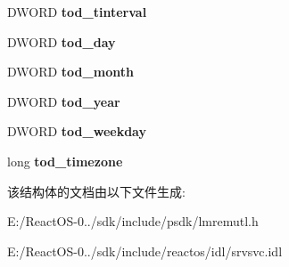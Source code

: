 \begin{DoxyCompactItemize}
\mbox{\label{struct___t_i_m_e___o_f___d_a_y___i_n_f_o_a1ca8798b067474d6fb2293686afc9b65}} 
D\+W\+O\+RD {\bfseries tod\+\_\+tinterval}
\item 
\mbox{\label{struct___t_i_m_e___o_f___d_a_y___i_n_f_o_a52cf511aa5bdc76354fb1401d225ad2d}} 
D\+W\+O\+RD {\bfseries tod\+\_\+day}
\item 
\mbox{\label{struct___t_i_m_e___o_f___d_a_y___i_n_f_o_a7d3fe796df2ebb43668e8ba299f6d897}} 
D\+W\+O\+RD {\bfseries tod\+\_\+month}
\item 
\mbox{\label{struct___t_i_m_e___o_f___d_a_y___i_n_f_o_abd5baa27fddb123545f342b90edffaa6}} 
D\+W\+O\+RD {\bfseries tod\+\_\+year}
\item 
\mbox{\label{struct___t_i_m_e___o_f___d_a_y___i_n_f_o_ac0a2ef13bf92a59ffa325221ac631480}} 
D\+W\+O\+RD {\bfseries tod\+\_\+weekday}
\item 
\mbox{\label{struct___t_i_m_e___o_f___d_a_y___i_n_f_o_a9f9986c2da0ec9b79165cefffe04b659}} 
long {\bfseries tod\+\_\+timezone}
\end{DoxyCompactItemize}


该结构体的文档由以下文件生成\+:\begin{DoxyCompactItemize}
\item 
E\+:/\+React\+O\+S-\/0../sdk/include/psdk/lmremutl.\+h\item 
E\+:/\+React\+O\+S-\/0../sdk/include/reactos/idl/srvsvc.\+idl\end{DoxyCompactItemize}
